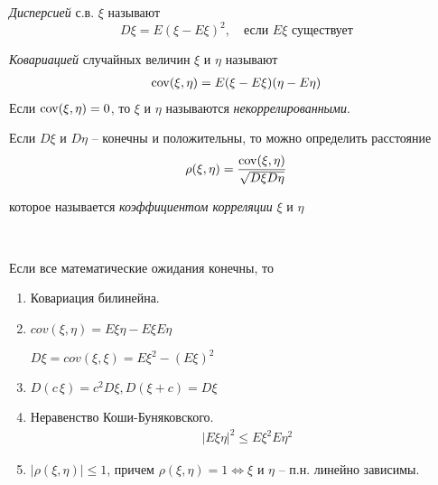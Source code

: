
\begin{definition}
  \emph{Дисперсией} с.в. $\xi$ называют
  \begin{equation*}
    D\xi = E(\xi - E\xi)^2, \quad \text{если $E\xi$ существует}
  \end{equation*}
\end{definition}

\begin{definition}
  \emph{Ковариацией} случайных величин $\xi$ и $\eta$ называют
  \begin{align*}
    \operatorname{cov}(\xi, \eta) = E(\xi - E\xi) (\eta - E\eta)
  \end{align*}
  Если $\operatorname{cov}(\xi, \eta) = 0$, то $\xi$ и $\eta$ называются \emph{некоррелированными}.
\end{definition}

Если $D\xi$ и $D\eta$ -- конечны и положительны, то можно определить расстояние
\begin{align*}
  \rho(\xi, \eta) = \frac{\operatorname{cov}(\xi, \eta)}{\sqrt{D \xi D \eta}}
\end{align*}

которое называется \emph{коэффициентом корреляции} $\xi$ и $\eta$

\begin{lemma}~

  Если все математические ожидания конечны, то 
  \begin{enumerate}
    \item 
      Ковариация билинейна.

    \item 
      $cov(\xi, \eta) = E \xi \eta - E\xi E\eta$

      $D\xi = cov(\xi, \xi) = E\xi^2 - (E \xi)^2$

    \item 
      $D(c\, \xi) = c^2 D \xi, D(\xi + c) = D \xi$

    \item 
      Неравенство Коши-Буняковского.
      \begin{align*}
        |E\xi \eta|^2 \leq E\xi^2 E\eta^2
      \end{align*}

    \item 
      $|\rho(\xi, \eta)| \leq 1$, 
      причем $\rho(\xi, \eta) = 1 \iff \xi$ и $\eta$ -- п.н. линейно зависимы.
  \end{enumerate}

\end{lemma}

